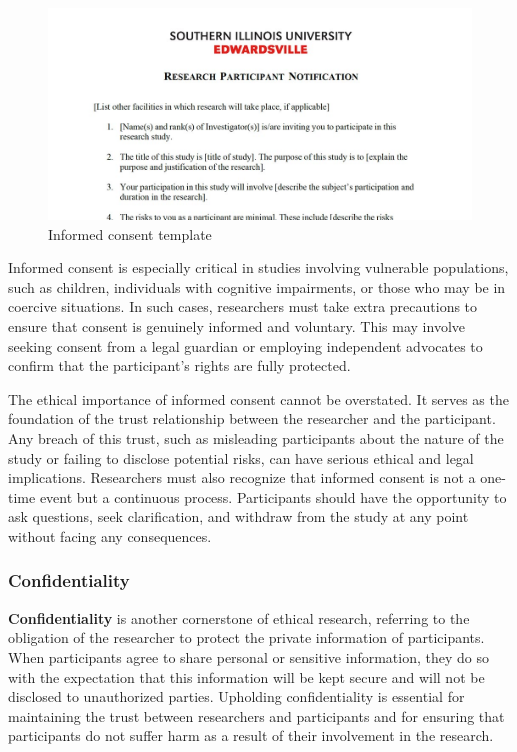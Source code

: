 \documentclass[
]{book}
\begin{document}
\begin{figure}
\centering
\includegraphics{images/fig01c.jpg}
\caption{Informed consent template}
\end{figure}

Informed consent is especially critical in studies involving vulnerable populations, such as children, individuals with cognitive impairments, or those who may be in coercive situations. In such cases, researchers must take extra precautions to ensure that consent is genuinely informed and voluntary. This may involve seeking consent from a legal guardian or employing independent advocates to confirm that the participant's rights are fully protected.

The ethical importance of informed consent cannot be overstated. It serves as the foundation of the trust relationship between the researcher and the participant. Any breach of this trust, such as misleading participants about the nature of the study or failing to disclose potential risks, can have serious ethical and legal implications. Researchers must also recognize that informed consent is not a one-time event but a continuous process. Participants should have the opportunity to ask questions, seek clarification, and withdraw from the study at any point without facing any consequences.

\subsubsection*{Confidentiality}\label{confidentiality}

\textbf{Confidentiality} is another cornerstone of ethical research, referring to the obligation of the researcher to protect the private information of participants. When participants agree to share personal or sensitive information, they do so with the expectation that this information will be kept secure and will not be disclosed to unauthorized parties. Upholding confidentiality is essential for maintaining the trust between researchers and participants and for ensuring that participants do not suffer harm as a result of their involvement in the research.
\end{document}
